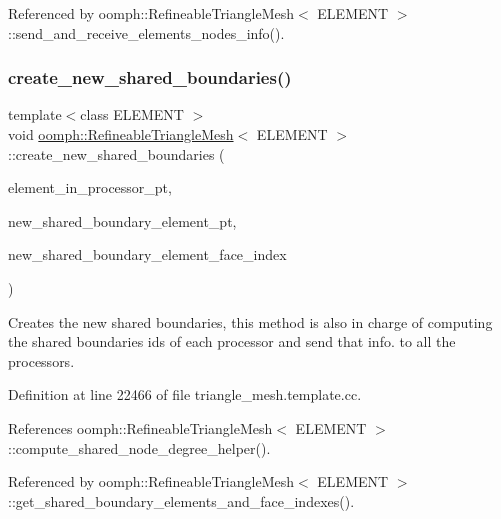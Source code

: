 Referenced by oomph\+::\+Refineable\+Triangle\+Mesh$<$ E\+L\+E\+M\+E\+N\+T $>$\+::send\+\_\+and\+\_\+receive\+\_\+elements\+\_\+nodes\+\_\+info().

\mbox{\label{classoomph_1_1RefineableTriangleMesh_adb26d1dbe4f06311599020171ec45140}} 
\subsubsection{\texorpdfstring{create\+\_\+new\+\_\+shared\+\_\+boundaries()}{create\_new\_shared\_boundaries()}}
{\footnotesize\ttfamily template$<$class E\+L\+E\+M\+E\+NT $>$ \\
void \hyperlink{classoomph_1_1RefineableTriangleMesh}{oomph\+::\+Refineable\+Triangle\+Mesh}$<$ E\+L\+E\+M\+E\+NT $>$\+::create\+\_\+new\+\_\+shared\+\_\+boundaries (\begin{DoxyParamCaption}\item[{std\+::set$<$ Finite\+Element $\ast$$>$ \&}]{element\+\_\+in\+\_\+processor\+\_\+pt,  }\item[{Vector$<$ Vector$<$ Finite\+Element $\ast$$>$ $>$ \&}]{new\+\_\+shared\+\_\+boundary\+\_\+element\+\_\+pt,  }\item[{Vector$<$ Vector$<$ unsigned $>$ $>$ \&}]{new\+\_\+shared\+\_\+boundary\+\_\+element\+\_\+face\+\_\+index }\end{DoxyParamCaption})}



Creates the new shared boundaries, this method is also in charge of computing the shared boundaries ids of each processor and send that info. to all the processors. 



Definition at line 22466 of file triangle\+\_\+mesh.\+template.\+cc.



References oomph\+::\+Refineable\+Triangle\+Mesh$<$ E\+L\+E\+M\+E\+N\+T $>$\+::compute\+\_\+shared\+\_\+node\+\_\+degree\+\_\+helper().



Referenced by oomph\+::\+Refineable\+Triangle\+Mesh$<$ E\+L\+E\+M\+E\+N\+T $>$\+::get\+\_\+shared\+\_\+boundary\+\_\+elements\+\_\+and\+\_\+face\+\_\+indexes().


